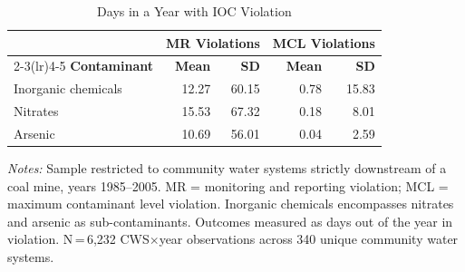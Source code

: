 \begin{table}[htbp]
\centering
\caption{Days in a Year with IOC Violation}
\label{tab:ioc_days_dwnstrm}
\small
\begin{tabular}{lrrrr}
\hline\hline
 & \multicolumn{2}{c}{\textbf{MR Violations}} & \multicolumn{2}{c}{\textbf{MCL Violations}} \\
\cmidrule(lr){2-3}\cmidrule(lr){4-5}
\textbf{Contaminant} & \textbf{Mean} & \textbf{SD} & \textbf{Mean} & \textbf{SD} \\
\hline
Inorganic chemicals & 12.27 & 60.15 & 0.78 & 15.83 \\
Nitrates & 15.53 & 67.32 & 0.18 & 8.01 \\
Arsenic & 10.69 & 56.01 & 0.04 & 2.59 \\
\hline\hline
\end{tabular}
\begin{minipage}{\linewidth}
\vspace{4pt}
\footnotesize
\textit{Notes:} Sample restricted to community water systems strictly downstream of a coal mine, years 1985--2005. MR = monitoring and reporting violation; MCL = maximum contaminant level violation. Inorganic chemicals encompasses nitrates and arsenic as sub-contaminants. Outcomes measured as days out of the year in violation. N\,=\,6,232 CWS$\times$year observations across 340 unique community water systems.
\end{minipage}
\end{table}
